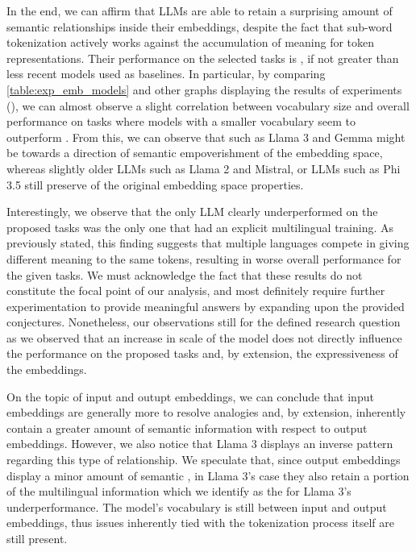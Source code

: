 In the end, we can affirm that LLMs are able to retain a surprising amount of semantic relationships inside their embeddings, despite the fact that sub-word tokenization actively works against the accumulation of meaning for token representations.
Their performance on the selected tasks is , if not greater than less recent models used as baselines.
In particular, by comparing \cref{table:exp_emb_models} and other graphs displaying the results of experiments (), we can almost observe a slight correlation between vocabulary size and overall performance on tasks where models with a smaller vocabulary seem to outperform .
From this, we can observe that  such as Llama 3 and Gemma might be  towards a direction of semantic empoverishment of the embedding space, whereas slightly older LLMs such as Llama 2 and Mistral, or LLMs  such as Phi 3.5 still preserve  of the original embedding space properties.

Interestingly, we observe that the only LLM  clearly underperformed on the proposed tasks was the only one that had an explicit multilingual training.
As previously stated, this finding suggests that multiple languages compete in giving different meaning to the same tokens, resulting in worse overall performance for the given tasks.
We must acknowledge the fact that these results do not constitute the focal point of our analysis, and most definitely require further experimentation to provide meaningful answers by expanding upon the provided conjectures.
Nonetheless, our observations still  for the defined research question as we observed that an increase in scale of the model does not directly influence the performance on the proposed tasks and, by extension, the expressiveness of the embeddings.

On the topic of input and outupt embeddings, we can conclude that input embeddings are generally more  to resolve analogies and, by extension, inherently contain a greater amount of semantic information with respect to output embeddings.
However, we also notice that Llama 3 displays an inverse pattern regarding this type of relationship.
We speculate that, since output embeddings display a minor amount of semantic , in Llama 3's case they also retain a  portion of the multilingual information which we identify as the  for Llama 3's underperformance.
The model's vocabulary is still  between input and output embeddings, thus issues inherently tied with the tokenization process itself are still present.

